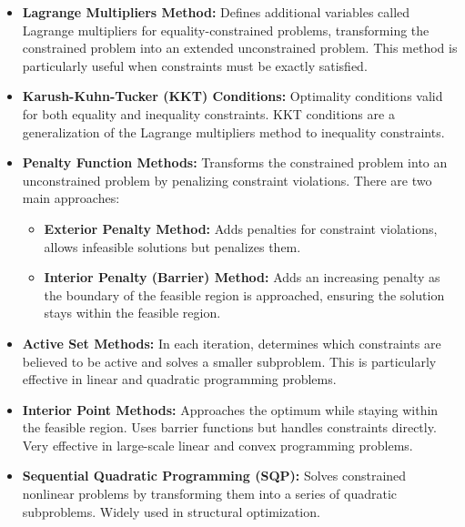 \begin{itemize}
    \item \textbf{Lagrange Multipliers Method:} Defines additional variables called Lagrange multipliers for equality-constrained problems, transforming the constrained problem into an extended unconstrained problem. This method is particularly useful when constraints must be exactly satisfied.
    
    \item \textbf{Karush-Kuhn-Tucker (KKT) Conditions:} Optimality conditions valid for both equality and inequality constraints. KKT conditions are a generalization of the Lagrange multipliers method to inequality constraints.
    
    \item \textbf{Penalty Function Methods:} Transforms the constrained problem into an unconstrained problem by penalizing constraint violations. There are two main approaches:
    \begin{itemize}
        \item \textbf{Exterior Penalty Method:} Adds penalties for constraint violations, allows infeasible solutions but penalizes them.
        \item \textbf{Interior Penalty (Barrier) Method:} Adds an increasing penalty as the boundary of the feasible region is approached, ensuring the solution stays within the feasible region.
    \end{itemize}
    
    \item \textbf{Active Set Methods:} In each iteration, determines which constraints are believed to be active and solves a smaller subproblem. This is particularly effective in linear and quadratic programming problems.
    
    \item \textbf{Interior Point Methods:} Approaches the optimum while staying within the feasible region. Uses barrier functions but handles constraints directly. Very effective in large-scale linear and convex programming problems.
    
    \item \textbf{Sequential Quadratic Programming (SQP):} Solves constrained nonlinear problems by transforming them into a series of quadratic subproblems. Widely used in structural optimization.
\end{itemize}

